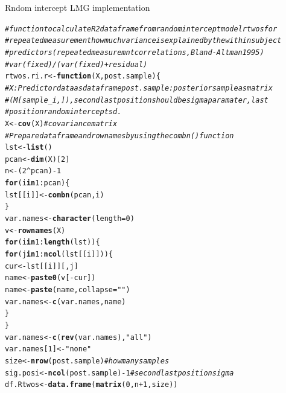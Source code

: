 \documentclass[11pt,a4paper,twoside]{book}\usepackage[]{graphicx}\usepackage[]{color}
\makeatletter
\newcommand{\hlnum}[1]{\textcolor[rgb]{0.686,0.059,0.569}{#1}}%
\newcommand{\hlstr}[1]{\textcolor[rgb]{0.192,0.494,0.8}{#1}}%
\newcommand{\hlcom}[1]{\textcolor[rgb]{0.678,0.584,0.686}{\textit{#1}}}%
\newcommand{\hlopt}[1]{\textcolor[rgb]{0,0,0}{#1}}%
\newcommand{\hlstd}[1]{\textcolor[rgb]{0.345,0.345,0.345}{#1}}%
\newcommand{\hlkwa}[1]{\textcolor[rgb]{0.161,0.373,0.58}{\textbf{#1}}}%
\newcommand{\hlkwb}[1]{\textcolor[rgb]{0.69,0.353,0.396}{#1}}%
\newcommand{\hlkwc}[1]{\textcolor[rgb]{0.333,0.667,0.333}{#1}}%
\newcommand{\hlkwd}[1]{\textcolor[rgb]{0.737,0.353,0.396}{\textbf{#1}}}%
\newenvironment{kframe}{%
 \def\at@end@of@kframe{}%
 \ifinner\ifhmode%
  \def\at@end@of@kframe{\end{minipage}}%
  \begin{minipage}{\columnwidth}%
 \fi\fi%
 \def\FrameCommand##1{\hskip\@totalleftmargin \hskip-\fboxsep
 \colorbox{shadecolor}{##1}\hskip-\fboxsep
     \hskip-\linewidth \hskip-\@totalleftmargin \hskip\columnwidth}%
 \MakeFramed {\advance\hsize-\width
   \@totalleftmargin\z@ \linewidth\hsize
   \@setminipage}}%
 {\par\unskip\endMakeFramed%
 \at@end@of@kframe}
\newenvironment{knitrout}{}{} %
\makeatother
\begin{document}
	\begin{codeenv}
\caption{Rndom intercept LMG implementation}\label{r04:LMG.ri}
\begin{knitrout}
\color{fgcolor}\begin{kframe}
\begin{alltt}
\hlcom{# function to calculate R2 data frame from random intercept model rtwos for}
\hlcom{# repeated measurement how much variance is explained by the within subject}
\hlcom{# predictors (repeated measuremnt correlations, Bland-Altman 1995)}
\hlcom{# var(fixed) / (var(fixed)+residual)}
\hlstd{rtwos.ri.r} \hlkwb{<-} \hlkwa{function}\hlstd{(}\hlkwc{X}\hlstd{,} \hlkwc{post.sample}\hlstd{) \{}
    \hlcom{# X: Predictor data as data frame post.sample: posterior sample as matrix}
    \hlcom{# (M[sample_i,]), second last position should be sigma paramater, last}
    \hlcom{# position random intercept sd.}
    \hlstd{X} \hlkwb{<-} \hlkwd{cov}\hlstd{(X)}  \hlcom{#covariance matrix}
    \hlcom{# Prepare data frame and rownames by using the combn() function}
    \hlstd{lst} \hlkwb{<-} \hlkwd{list}\hlstd{()}
    \hlstd{pcan} \hlkwb{<-} \hlkwd{dim}\hlstd{(X)[}\hlnum{2}\hlstd{]}
    \hlstd{n} \hlkwb{<-} \hlstd{(}\hlnum{2}\hlopt{^}\hlstd{pcan)} \hlopt{-} \hlnum{1}
    \hlkwa{for} \hlstd{(i} \hlkwa{in} \hlnum{1}\hlopt{:}\hlstd{pcan) \{}
        \hlstd{lst[[i]]} \hlkwb{<-} \hlkwd{combn}\hlstd{(pcan, i)}
    \hlstd{\}}
    \hlstd{var.names} \hlkwb{<-} \hlkwd{character}\hlstd{(}\hlkwc{length} \hlstd{=} \hlnum{0}\hlstd{)}
    \hlstd{v} \hlkwb{<-} \hlkwd{rownames}\hlstd{(X)}
    \hlkwa{for} \hlstd{(i} \hlkwa{in} \hlnum{1}\hlopt{:}\hlkwd{length}\hlstd{(lst)) \{}
        \hlkwa{for} \hlstd{(j} \hlkwa{in} \hlnum{1}\hlopt{:}\hlkwd{ncol}\hlstd{(lst[[i]])) \{}
            \hlstd{cur} \hlkwb{<-} \hlstd{lst[[i]][, j]}
            \hlstd{name} \hlkwb{<-} \hlkwd{paste0}\hlstd{(v[}\hlopt{-}\hlstd{cur])}
            \hlstd{name} \hlkwb{<-} \hlkwd{paste}\hlstd{(name,} \hlkwc{collapse} \hlstd{=} \hlstr{" "}\hlstd{)}
            \hlstd{var.names} \hlkwb{<-} \hlkwd{c}\hlstd{(var.names, name)}
        \hlstd{\}}
    \hlstd{\}}
    \hlstd{var.names} \hlkwb{<-} \hlkwd{c}\hlstd{(}\hlkwd{rev}\hlstd{(var.names),} \hlstr{"all"}\hlstd{)}
    \hlstd{var.names[}\hlnum{1}\hlstd{]} \hlkwb{<-} \hlstr{"none"}
    \hlstd{size} \hlkwb{<-} \hlkwd{nrow}\hlstd{(post.sample)}  \hlcom{# how many samples}
    \hlstd{sig.posi} \hlkwb{<-} \hlkwd{ncol}\hlstd{(post.sample)} \hlopt{-} \hlnum{1}  \hlcom{# second last position sigma}
    \hlstd{df.Rtwos} \hlkwb{<-} \hlkwd{data.frame}\hlstd{(}\hlkwd{matrix}\hlstd{(}\hlnum{0}\hlstd{, n} \hlopt{+} \hlnum{1}\hlstd{, size))}

\end{alltt}
\end{kframe}
\end{knitrout}
\end{codeenv}
\end{document}
